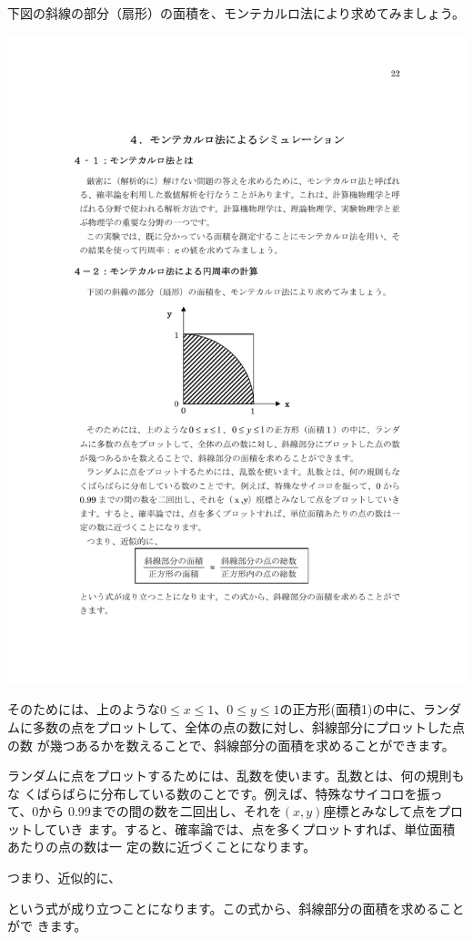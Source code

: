 下図の斜線の部分（扇形）の面積を、モンテカルロ法により求めてみましょう。
\begin{center}
\includegraphics[bb=193 342 378 499]{08_MonteCarlo/montecarlo1.pdf}
\end{center}
そのためには、上のような$0\leq x \leq 1$、$0\leq y \leq 1$の正方形(面積1)の中に、ランダ 
ムに多数の点をプロットして、全体の点の数に対し、斜線部分にプロットした点の数 
が幾つあるかを数えることで、斜線部分の面積を求めることができます。

ランダムに点をプロットするためには、乱数を使います。乱数とは、何の規則もな 
くばらばらに分布している数のことです。例えば、特殊なサイコロを振って、0から 
0.99までの間の数を二回出し、それを$(x,y)$座標とみなして点をプロットしていき 
ます。すると、確率論では、点を多くプロットすれば、単位面積あたりの点の数は一 
定の数に近づくことになります。

つまり、近似的に、
\begin{center}
\end{center}
という式が成り立つことになります。この式から、斜線部分の面積を求めることがで 
きます。

